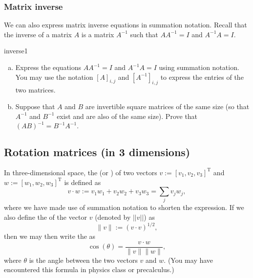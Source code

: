 \subsubsection*{Matrix inverse}

We can also express matrix inverse equations in summation notation.  Recall that the inverse of a matrix $A$ is a matrix $A^{-1}$ such that $AA^{-1}=I$ and $A^{-1}A=I$.

\begin{exercise}{inverse1}
\begin{enumerate}[(a)]
\item
Express the equations $AA^{-1}=I$ and $A^{-1}A=I$ using summation notation.  You may use the notation $[A]_{i,j}$ and $[A^{-1}]_{i,j}$ to express the entries of the two matrices.
\item
Suppose that $A$ and $B$ are invertible square matrices of the same size (so that $A^{-1}$ and $B^{-1}$ exist and are also of the same size). Prove that $(AB)^{-1} = B^{-1}A^{-1}$.
\end{enumerate}
\end{exercise}

\subsection{Rotation matrices (in 3 dimensions)}\label{subsec:rotMx3}
In three-dimensional space, the  (or ) of two vectors $v:=[v_1,v_2,v_3]^{\text{T}}$ and $w:=[w_1,w_2,w_3]^{\text{T}}$ is defined as
\[ v \cdot w :=  v_1w_1 + v_2w_2 + v_3w_3 = \sum_j v_j w_j ,\]
where we have made use of summation notation to shorten the expression. If we also define the  of the vector $v$ (denoted by $||v||$) as
\[ \lVert v\rVert := (v \cdot v)^{1/2}, \]
then we may then write the  as
\[ \cos(\theta) = \frac{v \cdot w}{\lVert v \rVert \lVert w \rVert}, \]
where $\theta$ is the angle between the two vectors $v$ and $w$. (You may have encountered this formula in physics class or precalculus.)

